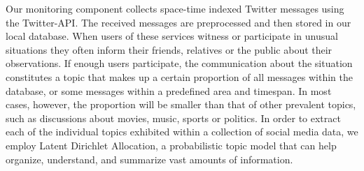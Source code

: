 
Our monitoring component collects space-time indexed Twitter messages using the Twitter-API.
The received messages are preprocessed and then stored in our local database.
When users of these services witness or participate in unusual situations 
they often inform their friends, relatives or the public about their observations.
%
If enough users participate, the communication about the situation constitutes a topic that makes up a certain proportion of all messages within the database, or some messages within a predefined area and timespan.
In most cases, however, the proportion will be smaller than that of other prevalent topics, such as discussions about movies, music, sports or politics.
In order to extract each of the individual topics exhibited within a collection of social media data, 
we employ Latent Dirichlet Allocation, a probabilistic topic model that can help organize, understand, and summarize vast amounts of information.

